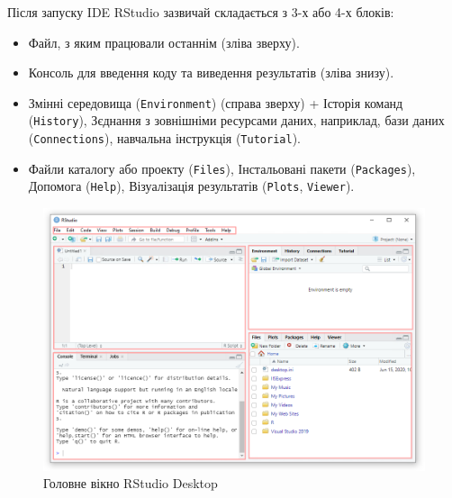 \documentclass[
]{book}
\providecommand{\tightlist}{%
  \setlength{\itemsep}{0pt}\setlength{\parskip}{0pt}}
\begin{document}
Після запуску IDE RStudio зазвичай складається з 3-х або 4-х блоків:

\begin{itemize}
\tightlist
\item
  Файл, з яким працювали останнім (зліва зверху).
\item
  Консоль для введення коду та виведення результатів (зліва знизу).
\item
  Змінні середовища (\texttt{Environment}) (справа зверху) + Історія команд (\texttt{History}), Зєднання з зовнішніми ресурсами даних, наприклад, бази даних (\texttt{Connections}), навчальна інструкція (\texttt{Tutorial}).
\item
  Файли каталогу або проекту (\texttt{Files}), Інстальовані пакети (\texttt{Packages}), Допомога (\texttt{Help}), Візуалізація результатів (\texttt{Plots}, \texttt{Viewer}).
\end{itemize}

\begin{figure}
\centering
\includegraphics{images/chapter1/rstudio_3.png}
\caption{\label{fig:unnamed-chunk-15}Головне вікно RStudio Desktop}
\end{figure}
\end{document}
